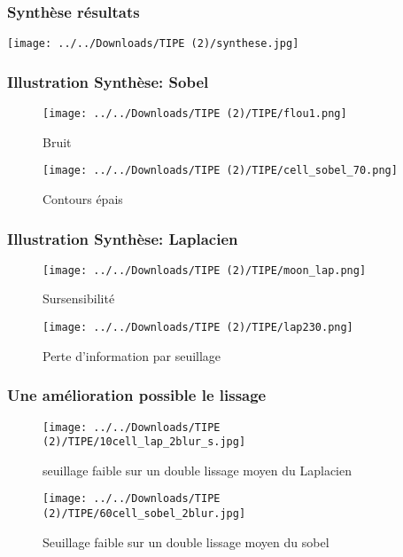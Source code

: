 \documentclass{beamer}
\begin{document}
\begin{frame}
\frametitle{Synthèse résultats}

\center \texttt{[image: ../../Downloads/TIPE (2)/synthese.jpg]}
\end{frame}

\begin{frame}
\frametitle{Illustration Synthèse: Sobel}

\begin{figure}[h]
    \begin{minipage}[c]{.46\linewidth}
        \centering
        \texttt{[image: ../../Downloads/TIPE (2)/TIPE/flou1.png]}
        \caption{Bruit}
    \end{minipage}
    \hfill%
    \begin{minipage}[c]{.46\linewidth}
        \centering
        \texttt{[image: ../../Downloads/TIPE (2)/TIPE/cell\_sobel\_70.png]}
        \caption{Contours épais}
    \end{minipage}
\end{figure}

\end{frame}

\begin{frame}
\frametitle{Illustration Synthèse: Laplacien}

\begin{figure}[h]
    \begin{minipage}[c]{.46\linewidth}
        \centering
        \texttt{[image: ../../Downloads/TIPE (2)/TIPE/moon\_lap.png]}
        \caption{Sursensibilité}
    \end{minipage}
    \hfill%
    \begin{minipage}[c]{.46\linewidth}
        \centering
        \texttt{[image: ../../Downloads/TIPE (2)/TIPE/lap230.png]}
        \caption{Perte d'information par seuillage}
    \end{minipage}
\end{figure}

\end{frame}

\begin{frame}
\frametitle{Une amélioration possible le lissage}

\begin{figure}[h]
    \begin{minipage}[c]{.46\linewidth}
        \centering
        \texttt{[image: ../../Downloads/TIPE (2)/TIPE/10cell\_lap\_2blur\_s.jpg]}
        \caption{seuillage faible sur un double lissage moyen du Laplacien}
    \end{minipage}
    \hfill%
    \begin{minipage}[c]{.46\linewidth}
        \centering
        \texttt{[image: ../../Downloads/TIPE (2)/TIPE/60cell\_sobel\_2blur.jpg]}
        \caption{Seuillage faible sur un double lissage moyen du sobel}
    \end{minipage}
\end{figure}
\end{frame}
\end{document}
